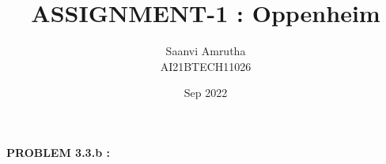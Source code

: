 \documentclass[journal,13pt,twocolumn]{IEEEtran}
\begin{document}
\newcommand{\taninv}{\tan^{-1}}
\renewcommand{\figurename}{Fig.}

\makeatletter
{}
\makeatother
\let\StandardTheFigure\thefigure
\let\vec\mathbf
\def\putbox#1#2#3{\makebox[0in][l]{\makebox[#1][l]{}\raisebox{\baselineskip}[0in][0in]{\raisebox{#2}[0in][0in]{#3}}}}
     \def\rightbox#1{\makebox[0in][r]{#1}}
     \def\centbox#1{\makebox[0in]{#1}}
     \def\topbox#1{\raisebox{-\baselineskip}[0in][0in]{#1}}
     \def\midbox#1{\raisebox{-0.5\baselineskip}[0in][0in]{#1}}


\vspace{3cm}
       
\title{ASSIGNMENT-1 : Oppenheim} 
\author{Saanvi Amrutha\\AI21BTECH11026} 
\date{Sep 2022}     


\maketitle

\newpage

\bigskip


\textbf{PROBLEM 3.3.b :}\\
\end{document}
